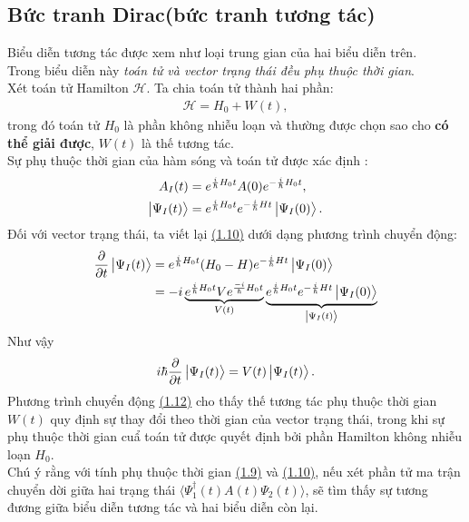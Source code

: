 \documentclass{report}
\begin{document}
\subsection{Bức tranh Dirac(bức tranh tương tác)}
Biểu diễn tương tác được xem như loại trung gian của hai biểu diễn trên.\\
Trong biểu diễn này \textit{toán tử và vector trạng thái đều phụ thuộc thời gian}.\\
Xét toán tử Hamilton $\mathcal{H}$. Ta chia toán tử thành hai phần:
\begin{align}\label{eq1.7}
	\mathcal{H} = H_0 + W(t),
\end{align}
trong đó toán tử $H_0$ là phần không nhiễu loạn và thường được chọn sao cho \textbf{có thể giải được}, $W(t)$ là thế tương tác.\\
Sự phụ thuộc thời gian của hàm sóng và toán tử được xác định :
\begin{align}
	\label{eq1.9}
	A_I(t)            & = e^{\frac{i}{\hbar}H_0t} A(0) e^{-\frac{i}{\hbar}H_0t},            \\
	\label{eq1.10}
	\ket{\Psi_{I}(t)} & =  e^{\frac{i}{\hbar}H_0t} e^{-\frac{i}{\hbar}Ht}\ket{\Psi_{I}(0)}.
\end{align}
Đối với vector trạng thái, ta viết lại \hyperref[eq1.10]{(1.10)} dưới dạng phương trình chuyển động:
\begin{align}
	\dfrac{\partial }{\partial t} \ket{\Psi_{I}(t)} & = e^{\frac{i}{\hbar}H_0t}(H_0 - H) e^{-\frac{i}{\hbar}Ht}\ket{\Psi_{I}(0)}\nonumber                                                                                              \\
	                                                & = -i  \underbrace{e^{\frac{i}{\hbar}H_0t} V e^{\frac{-i}{\hbar}H_0t} }_{V(t)} \underbrace{ e^{\frac{i}{\hbar}H_0t} e^{-\frac{i}{\hbar}Ht}\ket{\Psi_{I}(0)} }_{\ket{\Psi_{I}(t)}}
\end{align}
Như vậy
\begin{align}\label{eq1.12}
	i \hbar \dfrac{\partial}{\partial{t}} \ket{\Psi_{I}(t)} = V(t) \ket{\Psi_{I}(t)}.
\end{align}
Phương trình chuyển động \hyperref[eq1.12]{(1.12)} cho thấy thế tương tác phụ thuộc thời gian $W(t)$ quy định sự thay đổi theo thời gian của vector trạng thái, trong khi sự phụ thuộc thời gian cuẩ toán tử được quyết định bởi phần Hamilton không nhiễu loạn $H_0$.\\
Chú ý rằng với tính phụ thuộc thời gian \hyperref[eq1.9]{(1.9)} và \hyperref[eq1.10]{(1.10)}, nếu xét phần tử ma trận chuyển dời giữa hai trạng thái $\langle \Psi_{1}^{\dagger}(t) A(t) \Psi_{2}(t) \rangle$, sẽ tìm thấy sự tương đương giữa biểu diễn tương tác và hai biểu diễn còn lại.\\
\end{document}
